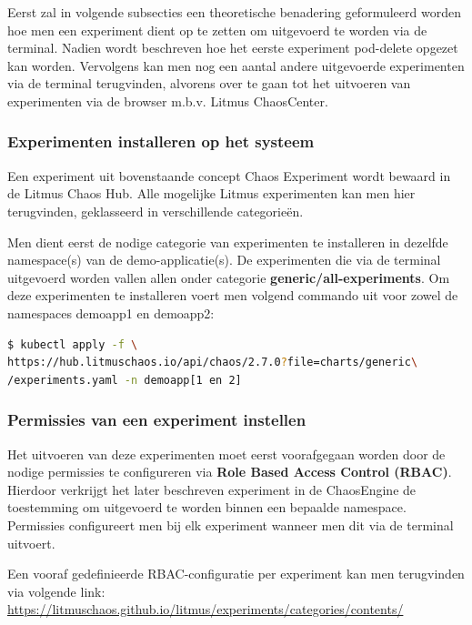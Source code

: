 Eerst zal in volgende subsecties een theoretische benadering geformuleerd worden hoe men een experiment dient op te zetten om uitgevoerd te worden via de terminal. Nadien wordt beschreven hoe het eerste experiment pod-delete opgezet kan worden. Vervolgens kan men nog een aantal andere uitgevoerde experimenten via de terminal terugvinden, alvorens over te gaan tot het uitvoeren van experimenten via de browser m.b.v. Litmus ChaosCenter.
 
\subsubsection{Experimenten installeren op het systeem}
\label{subsec:experimenteninstalleren}

Een experiment uit bovenstaande concept Chaos Experiment wordt bewaard in de Litmus Chaos Hub.  
Alle mogelijke Litmus experimenten kan men hier terugvinden, geklasseerd in verschillende categorieën. \autocite{ChaosHub2022} 

Men dient eerst de nodige categorie van experimenten te installeren in dezelfde namespace(s) van de demo-applicatie(s). De experimenten die via de terminal uitgevoerd worden vallen allen onder categorie {\bf generic/all-experiments}. \newline Om deze experimenten te installeren voert men volgend commando uit voor zowel de namespaces demoapp1 en demoapp2:
\begin{lstlisting}[language=bash]
$ kubectl apply -f \
https://hub.litmuschaos.io/api/chaos/2.7.0?file=charts/generic\
/experiments.yaml -n demoapp[1 en 2]
\end{lstlisting}

\subsubsection{Permissies van een experiment instellen}

Het uitvoeren van deze experimenten moet eerst voorafgegaan worden door de nodige permissies te configureren via {\bf Role Based Access Control (RBAC)}. Hierdoor verkrijgt het later beschreven experiment in de ChaosEngine de toestemming om uitgevoerd te worden binnen een bepaalde namespace. Permissies configureert men bij elk experiment wanneer men dit via de terminal uitvoert. 

Een vooraf gedefinieerde RBAC-configuratie per experiment kan men terugvinden via volgende link: \url{https://litmuschaos.github.io/litmus/experiments/categories/contents/}


